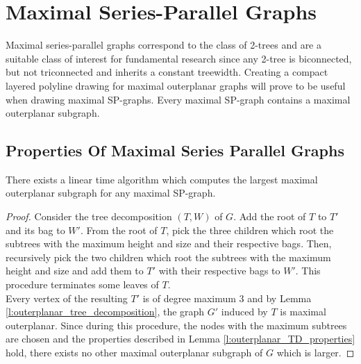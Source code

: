 \section{Maximal Series-Parallel Graphs}\label{section:SP-graphs}
Maximal series-parallel graphs correspond to the class of 2-trees \cite[P. 2]{straight-line_2-trees} and are a suitable class of interest for fundamental research since any 2-tree is biconnected, but not triconnected and inherits a constant treewidth. Creating a compact layered polyline drawing for maximal outerplanar graphs will prove to be useful when drawing maximal SP-graphs. Every maximal SP-graph contains a maximal outerplanar subgraph. 

\subsection{Properties Of Maximal Series Parallel Graphs}


\begin{lemma}
	There exists a linear time algorithm which computes the largest maximal outerplanar subgraph for any maximal SP-graph.
\end{lemma}
\begin{proof}
	Consider the tree decomposition $(T,W)$ of $G$. Add the root of $T$ to $T'$ and its bag to $W'$. From the root of $T$, pick the three children which root the subtrees with the maximum height and size and their respective bags. Then, recursively pick the two children which root the subtrees with the maximum height and size and add them to $T'$ with their respective bags to $W'$. This procedure terminates some leaves of $T$.\\
	Every vertex of the resulting $T'$ is of degree maximum 3 and by Lemma \ref{l:outerplanar_tree_decomposition}, the graph $G'$ induced by $T$ is maximal outerplanar. Since during this procedure, the nodes with the maximum subtrees are chosen and the properties described in Lemma \ref{l:outerplanar_TD_properties} hold, there exists no other maximal outerplanar subgraph of $G$ which is larger. 
\end{proof}

